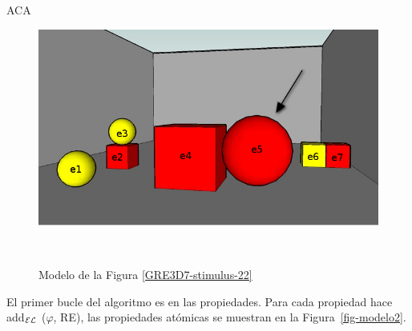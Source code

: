 ACA
\begin{figure}[ht]
\begin{minipage}[b]{0.45\linewidth}
\centering
\includegraphics[width=\textwidth]{images/22.jpg}
\vspace*{1cm}
\label{GRE3D7-stimulus-22}
\end{minipage}
\begin{minipage}[b]{0.6\linewidth}
\centering
\\[0pt]
\caption{Modelo de la Figura \ref{GRE3D7-stimulus-22}}
\label{fig-modelo}
\end{minipage}
\end{figure}
El primer bucle del algoritmo es en las propiedades. Para cada propiedad hace add$_\mathcal{EL}$ ($\varphi$, RE), las propiedades at\'omicas se muestran en la Figura~\ref{fig-modelo2}.

